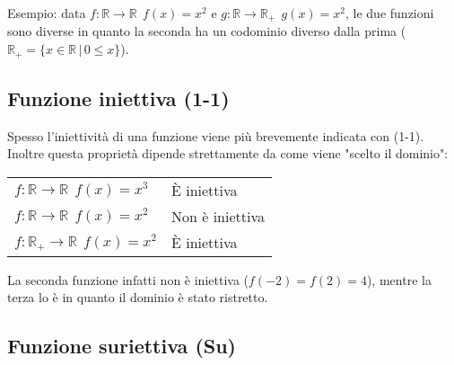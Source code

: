 Esempio: data $f: \mathbb{R} \to \mathbb{R}\;\, f(x) = x^2$ e $g: \mathbb{R} \to \mathbb{R}_{+}\;\, g(x) = x^2$, le due funzioni sono diverse in quanto la seconda ha un codominio diverso dalla prima ($\mathbb{R}_{+} = \{x \in \mathbb{R}\, |\, 0 \leq x\}$).\\


\subsection{Funzione iniettiva (1-1)}


Spesso l'iniettività di una funzione viene più brevemente indicata con (1-1). Inoltre questa proprietà dipende strettamente da come viene "scelto il dominio":

\begin{table}[H]
\centering
\begin{tabular}{ll}
$f: \mathbb{R} \to \mathbb{R}\;\, f(x) = x^3$          & È iniettiva      \\
$f: \mathbb{R} \to \mathbb{R}\;\, f(x) = x^2$        & Non è iniettiva  \\
$f: \mathbb{R}_{+} \to \mathbb{R}\;\, f(x) = x^2$ & È iniettiva     
\end{tabular}
\end{table}

La seconda funzione infatti non è iniettiva ($f(-2) = f(2) = 4$), mentre la terza lo è in quanto il dominio è stato ristretto.

\subsection{Funzione suriettiva (Su)}


